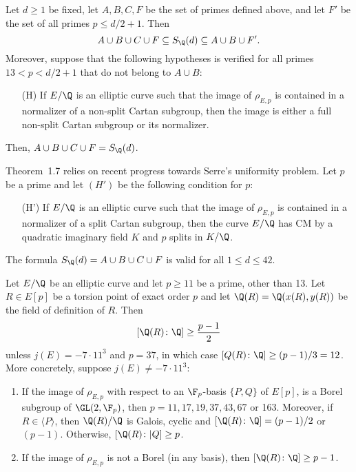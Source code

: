 \begin{thm} %
Let $d \geq 1$ be fixed, let $A, B, C, F$ be the set of primes defined above, and let $F'$ be the set of all primes $p \leq d/2 + 1$. Then
	\[
	A \cup B \cup C \cup F \subseteq S_\Q(d) \subseteq A \cup B \cup F'.
	\]
Moreover, suppose that the following hypotheses is verified for all primes $13 < p < d/2 + 1$ that do not belong to $A \cup B$:
	\begin{enumerate}
	\item[(H)] If $E/\Q$ is an elliptic curve such that the image of $\rho_{E,p}$ is contained in a normalizer of a non-split Cartan subgroup, then the image is either a full non-split Cartan subgroup or its normalizer. 
	\end{enumerate}
Then, $A \cup B \cup C \cup F= S_\Q(d)$. 
\end{thm}


Theorem~1.7 relies on recent progress towards Serre’s uniformity problem. Let $p$ be
a prime and let $(H')$ be the following condition for $p$:
	\begin{enumerate}
	\item[(H')] If $E/\Q$ is an elliptic curve such that the image of $\rho_{E,p}$ is contained in a normalizer of a split Cartan subgroup, then the curve $E/\Q$ has CM by a quadratic imaginary field $K$ and $p$ splits in $K/\Q$. 
	\end{enumerate}


\begin{cor} %
The formula $S_\Q(d)= A \cup B \cup C \cup F$ is valid for all $1 \leq d \leq 42$. 
\end{cor}


\begin{thm} %
Let $E/\Q$ be an elliptic curve and let $p \geq 11$ be a prime, other than 13. Let $R \in E[p]$ be a torsion point of exact order $p$ and let $\Q(R)= \Q(x(R),y(R))$ be the field of definition of $R$. Then
	\[
	[\Q(R) \colon \Q] \geq \dfrac{p - 1}{2}
	\]
unless $j(E)= -7 \cdot 11^3$ and $p= 37$, in which case $[Q(R) \colon \Q] \geq (p - 1)/3= 12$. More concretely, suppose $j(E) \neq -7 \cdot 11^3$:
	\begin{enumerate}[(1)]
	\item If the image of $\rho_{E,p}$ with respect to an $\F_p$-basis $\{P, Q\}$ of $E[p]$, is a Borel subgroup of $\GL(2,\F_p)$, then $p= 11, 17, 19, 37, 43, 67$ or 163. Moreover, if $R \in \langle P \rangle$, then $\Q(R)/\Q$ is Galois, cyclic and $[\Q(R) \colon \Q]= (p - 1)/2$ or $(p-1)$. Otherwise, $[\Q(R) \colon |Q] \geq p$. 
	\item If the image of $\rho_{E,p}$ is not a Borel (in any basis), then $[\Q(R) \colon \Q] \geq p - 1$. 
	\end{enumerate}
\end{thm}


